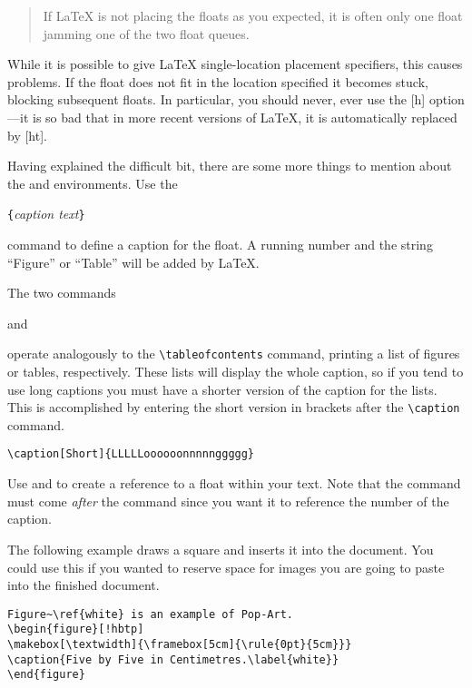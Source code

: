 \begin{quote}
If \LaTeX{} is not placing the floats as you expected,
it is often only one float jamming one of the two float queues.
\end{quote}                 

While it is possible to give \LaTeX{}  single-location placement
specifiers, this causes problems.  If the float does not fit in the
location specified it becomes stuck, blocking subsequent floats.
In particular, you should never, ever use the [h] option---it is so bad
that in more recent versions of \LaTeX, it is automatically replaced by
[ht].

\bigskip
\noindent Having explained the difficult bit, there are some more things to
mention about the  and  environments.
Use the 

\begin{lscommand}
\verb|{|\emph{caption text}\verb|}|
\end{lscommand}

\noindent command to define a caption for the float. A running number and
the string ``Figure'' or ``Table'' will be added by \LaTeX.

The two commands

\begin{lscommand}
 and  
\end{lscommand}

\noindent operate analogously to the \verb|\tableofcontents| command,
printing a list of figures or tables, respectively.  These lists will
display the whole caption, so if you tend to use long captions
you must have a shorter version of the caption for the lists.
This is accomplished by entering the short version in brackets after
the \verb|\caption| command.
\begin{code}
\verb|\caption[Short]{LLLLLoooooonnnnnggggg}| 
\end{code}

Use  and  to create a reference to a float within
your text. Note that the  command must come \emph{after} the
 command since you want it to reference the number of the
caption.

The following example draws a square and inserts it into the
document. You could use this if you wanted to reserve space for images
you are going to paste into the finished document.

\begin{code}
\begin{verbatim}
Figure~\ref{white} is an example of Pop-Art.
\begin{figure}[!hbtp]
\makebox[\textwidth]{\framebox[5cm]{\rule{0pt}{5cm}}}
\caption{Five by Five in Centimetres.\label{white}}
\end{figure}
\end{verbatim}
\end{code}

